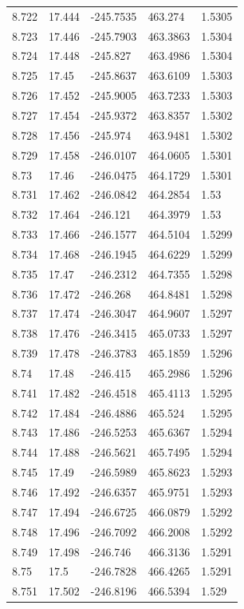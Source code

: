 \begin{tabular}{lllll}
8.722 & 17.444 & -245.7535 & 463.274 & 1.5305 \\
8.723 & 17.446 & -245.7903 & 463.3863 & 1.5304 \\
8.724 & 17.448 & -245.827 & 463.4986 & 1.5304 \\
8.725 & 17.45 & -245.8637 & 463.6109 & 1.5303 \\
8.726 & 17.452 & -245.9005 & 463.7233 & 1.5303 \\
8.727 & 17.454 & -245.9372 & 463.8357 & 1.5302 \\
8.728 & 17.456 & -245.974 & 463.9481 & 1.5302 \\
8.729 & 17.458 & -246.0107 & 464.0605 & 1.5301 \\
8.73 & 17.46 & -246.0475 & 464.1729 & 1.5301 \\
8.731 & 17.462 & -246.0842 & 464.2854 & 1.53 \\
8.732 & 17.464 & -246.121 & 464.3979 & 1.53 \\
8.733 & 17.466 & -246.1577 & 464.5104 & 1.5299 \\
8.734 & 17.468 & -246.1945 & 464.6229 & 1.5299 \\
8.735 & 17.47 & -246.2312 & 464.7355 & 1.5298 \\
8.736 & 17.472 & -246.268 & 464.8481 & 1.5298 \\
8.737 & 17.474 & -246.3047 & 464.9607 & 1.5297 \\
8.738 & 17.476 & -246.3415 & 465.0733 & 1.5297 \\
8.739 & 17.478 & -246.3783 & 465.1859 & 1.5296 \\
8.74 & 17.48 & -246.415 & 465.2986 & 1.5296 \\
8.741 & 17.482 & -246.4518 & 465.4113 & 1.5295 \\
8.742 & 17.484 & -246.4886 & 465.524 & 1.5295 \\
8.743 & 17.486 & -246.5253 & 465.6367 & 1.5294 \\
8.744 & 17.488 & -246.5621 & 465.7495 & 1.5294 \\
8.745 & 17.49 & -246.5989 & 465.8623 & 1.5293 \\
8.746 & 17.492 & -246.6357 & 465.9751 & 1.5293 \\
8.747 & 17.494 & -246.6725 & 466.0879 & 1.5292 \\
8.748 & 17.496 & -246.7092 & 466.2008 & 1.5292 \\
8.749 & 17.498 & -246.746 & 466.3136 & 1.5291 \\
8.75 & 17.5 & -246.7828 & 466.4265 & 1.5291 \\
8.751 & 17.502 & -246.8196 & 466.5394 & 1.529 \\

\end{tabular}
